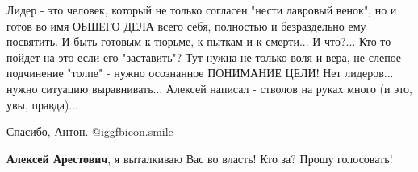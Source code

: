\begin{itemize}

Лидер - это человек, который не только согласен "нести лавровый венок", но и
готов во имя ОБЩЕГО ДЕЛА всего себя, полностью и безраздельно ему посвятить. И
быть готовым к тюрьме, к пыткам и к смерти... И что?... Кто-то пойдет на это
если его "заставить"? Тут нужна не только воля и вера, не слепое подчинение
"толпе" - нужно осознанное ПОНИМАНИЕ ЦЕЛИ! Нет лидеров... нужно ситуацию
выравнивать... Алексей написал - стволов на руках много (и это, увы, правда)...

Спасибо, Антон. @igg{fbicon.smile} 

\textbf{Алексей Арестович}, я выталкиваю Вас во власть! Кто за? Прошу голосовать!

\end{itemize} %
